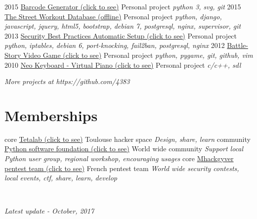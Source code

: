 \documentclass[]{friggeri-cv}
\begin{document}
\begin{entrylist}
    \entry
        {2015}
        {\href{http://pypi.python.org/pypi/barcode-generator/0.1rc15}{Barcode Generator (click to see)}}
        {Personal project}
        {\emph{python 3, svg, git}}
    \entry
        {2015}
        {\href{https://github.com/4383/street-workout-database}{The Street Workout Database (offline)}}
        {Personal project}
        {\emph{python, django, javascript, jquery, html5, bootstrap, debian 7, postgresql, nginx, supervisor, git}}
    \entry
        {2013}
        {\href{https://github.com/4383/fabric-debian/}{Security Best Practices Automatic Setup (click to see)}}
        {Personal project}
        {\emph{python, iptables,  debian 6, port-knocking, fail2ban, postgresql, nginx}}
    \entry
        {2012}
        {\href{http://github.com/4383/battle-story/}{Battle-Story Video Game (click to see)}}
        {Personal project}
        {\emph{python, pygame, git, github, vim}}
    \entry
        {2010}
        {\href{http://fr.wikipedia.org/wiki/Neo\_Keyboard}{Neo Keyboard - Virtual Piano (click to see)}}
        {Personal project}
        {\emph{c/c++, sdl}}
\end{entrylist}

\begin{flushright}
    \emph{More projects at https://github.com/4383}
\end{flushright}

\section{Memberships}
\begin{entrylist}
    \entry
        {core}
        {\href{https://www.tetalab.org/en}{Tetalab (click to see)}}
        {Toulouse hacker space}
        {\emph{Design, share, learn}}
    \entry
        {community}
        {\href{https://www.python.org/psf/}{Python software foundation (click to see)}}
        {World wide community}
        {\emph{Support local Python user group, regional workshop, encouraging usages}}
    \entry
        {core}
        {\href{https://github.com/mhackgyver-squad/mhackgyver}{Mhackgyver pentest team (click to see)}}
        {French pentest team}
        {\emph{World wide security contests, local events, ctf, share, learn, develop}}
\end{entrylist}

~
\begin{flushright}
    \emph{Latest update - October, 2017}
\end{flushright}
\end{document}
